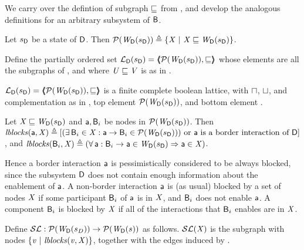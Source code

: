 We carry over the defintion of subgraph $\subg$ from , and develop the analogous definitions for an arbitrary subsystem \DS
of $\B$.


\begin{definition} \label{defn:wsetOfSubgraphsLoc}
Let $\sD$ be a state of $\DS$. Then 
$\lwfgS{B}{\sD}{\DS} \df  \set{ \XS \stt \XS \subg \lwfg{B}{\sD}{\DS} }$.
\end{definition}

\begin{definition} \label{defn:wflatticeLoc}
Define the partially ordered set 
$\llat{\B}{\sD}{\DS}  = \tpl{ \lwfgS{B}{\sD}{\DS},  \subg }$ 
whose elements are all the subgraphs of 
, and where  $\US \subg \VS$ is as in .   
\end{definition}

\begin{proposition} \label{prop:isALatticeLoc}
$\llat{\B}{\sD}{\DS}  = \tpl{ \lwfgS{B}{\sD}{\DS},  \subg }$
 is a finite complete boolean lattice, with $\meet$, $\join$, and complementation as in 
, top element $\lwfgS{B}{\sD}{\DS}$, and bottom element \ewfg.
\end{proposition}

\begin{definition} \label{defn:blocksLoc}
Let $\XS \subg \lwfg{\B}{\sD}{\DS}$ and $\act, \B_i$ be nodes in $\lwfgS{B}{\sD}{\DS}$. Then 
$\lblocks{\act}{\XS} \df
[ (\ex \B_i \in \XS : \act \ar \B_i \in \lwfgS{B}{\sD}{\DS})
   \mbox{ or $\act$ is a border interaction of $\DS$} ]$, and 
$\lblocks{\B_i}{\XS} \df (\fa \act : \B_i \ar \act \in \lwfg{B}{\sD}{\DS} \imp \act \in \XS)$.
\end{definition}
Hence a border interaction $\act$ is pessimistically considered to be always blocked, since
the subsystem $\DS$ does not contain enough information about the enablement of $\act$.
A non-border interaction $\act$ is (as usual) blocked by a set of nodes $\XS$ if some participant $\B_i$ of 
$\act$ is in $\XS$, and $\B_i$ does not enable $\act$.
A component $\B_i$ is blocked by $\XS$ if all of the interactions that $\B_i$ enables are in $\XS$.


\begin{definition}[$\lSFs$] \label{defn:scFixLoc}
Define $\lSFs:  \lwfgS{B}{s_D}{\DS}  \to  \lwfgS{B}{s}{\DS}$ as follows.
$\lSF{\XS}$ is the subgraph with nodes $\set{\ndv \stt \lblocks{\ndv}{\XS} }$, together with the edges induced by .
\end{definition}

